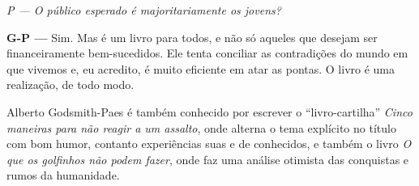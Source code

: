 \emph{P --- O público esperado é majoritariamente os jovens?}

\textbf{G-P ---} Sim. Mas é um livro para todos, e não só aqueles que desejam ser financeiramente bem-sucedidos. Ele tenta conciliar as contradições do mundo em que vivemos e, eu acredito, é muito eficiente em atar as pontas. O livro é uma realização, de todo modo.

Alberto Godsmith-Paes é também conhecido por escrever o ``livro-cartilha'' \emph{Cinco maneiras para não reagir a um assalto}, onde alterna o tema explícito no título com bom humor, contanto experiências suas e de conhecidos, e também o livro \emph{O que os golfinhos não podem fazer}, onde faz uma análise otimista das conquistas e rumos da humanidade.
